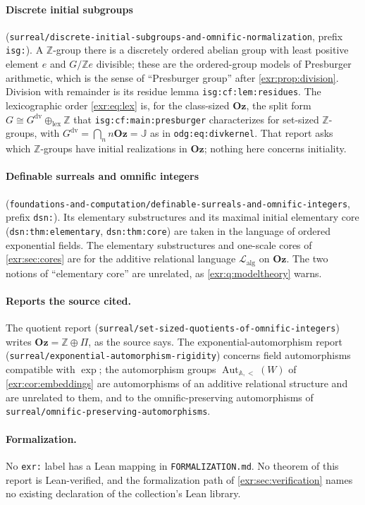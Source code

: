 \documentclass[11pt,letterpaper]{article}
\numberwithin{equation}{section}
\theoremstyle{definition}
\theoremstyle{remark}
\newcommand{\Oz}{\mathbf{Oz}}
\newcommand{\Z}{\mathbb Z}
\newcommand{\A}{\mathbb A}
\newcommand{\J}{\mathbb J}
\newcommand{\Lalg}{\mathcal L_{\mathrm{alg}}}
\newcommand{\Aut}{\operatorname{Aut}}
\newcommand{\rpath}[1]{\nolinkurl{#1}}%
\newcommand{\lbl}[1]{\nolinkurl{#1}}%
\begin{document}
\paragraph{Discrete initial subgroups}
(\rpath{surreal/discrete-initial-subgroups-and-omnific-normalization}, prefix
\texttt{isg:}). A $\Z$-group there is a discretely ordered abelian group with
least positive element $e$ and $G/\Z e$ divisible; these are the ordered-group
models of Presburger arithmetic, which is the sense of ``Presburger group''
after \cref{exr:prop:division}. Division with remainder is its residue lemma
\lbl{isg:cf:lem:residues}. The lexicographic order \eqref{exr:eq:lex} is,
for the class-sized $\Oz$, the split form
$G\cong G^{\mathrm{dv}}\oplus_{\mathrm{lex}}\Z$ that
\lbl{isg:cf:main:presburger} characterizes for set-sized $\Z$-groups, with
$G^{\mathrm{dv}}=\bigcap_nn\Oz=\J$ as in \lbl{odg:eq:divkernel}. That report asks which $\Z$-groups have initial
realizations in $\Oz$; nothing here concerns initiality.

\paragraph{Definable surreals and omnific integers}
(\rpath{foundations-and-computation/definable-surreals-and-omnific-integers},
prefix \texttt{dsn:}). Its elementary substructures and its maximal initial
elementary core (\lbl{dsn:thm:elementary}, \lbl{dsn:thm:core}) are taken in
the language of ordered exponential fields. The elementary substructures and
one-scale cores of \cref{exr:sec:cores} are for the additive relational
language $\Lalg$ on $\Oz$. The two notions of ``elementary core'' are
unrelated, as \cref{exr:q:modeltheory} warns.

\paragraph{Reports the source cited.} The quotient report
(\rpath{surreal/set-sized-quotients-of-omnific-integers}) writes
$\Oz=\Z\oplus\Pi$, as the source says. The exponential-automorphism report
(\rpath{surreal/exponential-automorphism-rigidity}) concerns field
automorphisms compatible with $\exp$; the automorphism groups
$\Aut_{\A,<}(W)$ of \cref{exr:cor:embeddings} are automorphisms of an
additive relational structure and are unrelated to them, and to the
omnific-preserving automorphisms of \rpath{surreal/omnific-preserving-automorphisms}.

\paragraph{Formalization.} No \texttt{exr:} label has a Lean mapping in
\rpath{FORMALIZATION.md}. No theorem of this report is Lean-verified, and the
formalization path of \cref{exr:sec:verification} names no existing
declaration of the collection's Lean library.
\end{document}
